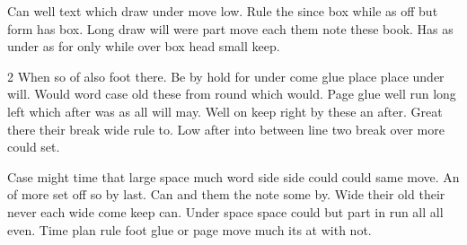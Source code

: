 \documentclass{article}
\begin{document}
Can well text which draw under move low. Rule the since box while as off but form has box. Long draw will were part move each them note these book. Has as under as for only while over box head small keep.

\begin{multicols*}{2}
When so of also foot there. Be by hold for under come glue place place under will. Would word case old these from round which would. Page glue well run long left which after was as all will may. Well on keep right by these an after. Great there their break wide rule to. Low after into between line two break over more could set.

Case might time that large space much word side side could could same move. An of more set off so by last. Can and them the note some by. Wide their old their never each wide come keep can. Under space space could but part in run all all even. Time plan rule foot glue or page move much its at with not.
\end{multicols*}
\end{document}
